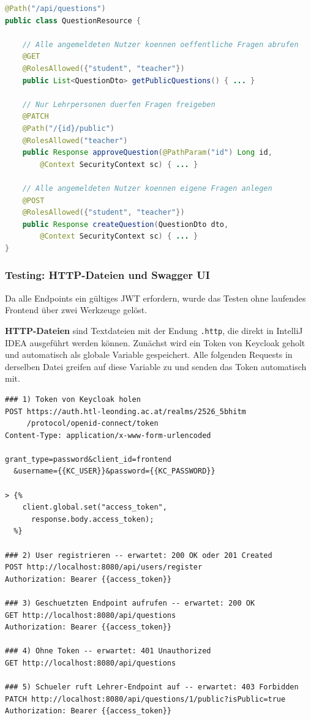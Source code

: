 \begin{lstlisting}[language=Java,
                   caption={Annotationen an Beispiel-Endpoints (QuestionResource.java)},
                   label={lst:roles-backend}]
@Path("/api/questions")
public class QuestionResource {

    // Alle angemeldeten Nutzer koennen oeffentliche Fragen abrufen
    @GET
    @RolesAllowed({"student", "teacher"})
    public List<QuestionDto> getPublicQuestions() { ... }

    // Nur Lehrpersonen duerfen Fragen freigeben
    @PATCH
    @Path("/{id}/public")
    @RolesAllowed("teacher")
    public Response approveQuestion(@PathParam("id") Long id,
        @Context SecurityContext sc) { ... }

    // Alle angemeldeten Nutzer koennen eigene Fragen anlegen
    @POST
    @RolesAllowed({"student", "teacher"})
    public Response createQuestion(QuestionDto dto,
        @Context SecurityContext sc) { ... }
}
\end{lstlisting}

\subsubsection{Testing: HTTP-Dateien und Swagger UI}

Da alle Endpoints ein gültiges JWT erfordern, wurde das Testen ohne
laufendes Frontend über zwei Werkzeuge gelöst.

\textbf{HTTP-Dateien} sind Textdateien mit der Endung \texttt{.http},
die direkt in IntelliJ IDEA ausgeführt werden können. Zunächst wird
ein Token von Keycloak geholt und automatisch als globale Variable
gespeichert. Alle folgenden Requests in derselben Datei greifen auf
diese Variable zu und senden das Token automatisch mit.

\begin{lstlisting}[caption={auth.http -- Token holen und Endpoints testen},
                   label={lst:auth-http}]
### 1) Token von Keycloak holen
POST https://auth.htl-leonding.ac.at/realms/2526_5bhitm
     /protocol/openid-connect/token
Content-Type: application/x-www-form-urlencoded

grant_type=password&client_id=frontend
  &username={{KC_USER}}&password={{KC_PASSWORD}}

> {%
    client.global.set("access_token",
      response.body.access_token);
  %}

### 2) User registrieren -- erwartet: 200 OK oder 201 Created
POST http://localhost:8080/api/users/register
Authorization: Bearer {{access_token}}

### 3) Geschuetzten Endpoint aufrufen -- erwartet: 200 OK
GET http://localhost:8080/api/questions
Authorization: Bearer {{access_token}}

### 4) Ohne Token -- erwartet: 401 Unauthorized
GET http://localhost:8080/api/questions

### 5) Schueler ruft Lehrer-Endpoint auf -- erwartet: 403 Forbidden
PATCH http://localhost:8080/api/questions/1/public?isPublic=true
Authorization: Bearer {{access_token}}
\end{lstlisting}

